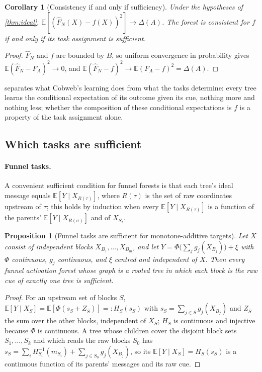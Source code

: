 \documentclass[11pt]{article}
\newtheorem{proposition}[theorem]{Proposition}
\newtheorem{corollary}[theorem]{Corollary}
\theoremstyle{definition}
\theoremstyle{remark}
\newcommand{\E}{\mathbb{E}}
\begin{document}
\begin{corollary}[Consistency if and only if sufficiency]\label{cor:iff}
Under the hypotheses of \cref{thm:ideal}, $\E[(\hat F_N(X)-f(X))^2]\to\Delta(A)$.  The
forest is consistent for $f$ if and only if its task assignment is sufficient.
\end{corollary}
\begin{proof}
$\hat F_N$ and $f$ are bounded by $B$, so uniform convergence in probability gives
$\E(\hat F_N-F_A)^2\to0$, and $\E(\hat F_N-f)^2\to\E(F_A-f)^2=\Delta(A)$.
\end{proof}

 separates what Cobweb's learning does from what the tasks determine:
every tree learns the conditional expectation of its outcome given its cue, nothing more
and nothing less; whether the composition of these conditional expectations is $f$ is a
property of the task assignment alone.

\subsection{Which tasks are sufficient}

\paragraph{Funnel tasks.}
A convenient sufficient condition for funnel forests is that each tree's ideal message
equals $\E[Y\mid X_{R(\tau)}]$, where $R(\tau)$ is the set of raw coordinates upstream of
$\tau$; this holds by induction when every $\E[Y\mid X_{R(\tau)}]$ is a function of the
parents' $\E[Y\mid X_{R(\sigma)}]$ and of $X_{S_\tau}$.

\begin{proposition}[Funnel tasks are sufficient for monotone-additive targets]\label{prop:suffclass}
Let $X$ consist of independent blocks $X_{B_1},\dots,X_{B_m}$, and let
$Y=\Phi\bigl(\sum_jg_j(X_{B_j})\bigr)+\xi$ with $\Phi$ continuous,
$g_j$ continuous, and $\xi$ centred and independent of $X$.  Then every funnel
activation forest whose graph is a rooted tree in which each block is the raw cue of
exactly one tree is sufficient.
\end{proposition}
\begin{proof}
For an upstream set of blocks $S$, $\E[Y\mid X_S]=\E[\Phi(s_S+Z_{\bar S})]=:H_S(s_S)$ with
$s_S=\sum_{j\in S}g_j(X_{B_j})$ and $Z_{\bar S}$ the sum over the other blocks, independent
of $X_S$; $H_S$ is continuous and injective because $\Phi$ is continuous.  A tree whose
children cover the disjoint block sets $S_1,\dots,S_k$ and which reads the raw blocks $S_0$
has $s_S=\sum_iH_{S_i}^{-1}(m_{S_i})+\sum_{j\in S_0}g_j(X_{B_j})$, so its
$\E[Y\mid X_S]=H_S(s_S)$ is a continuous function of its parents' messages and its raw
cue.
\end{proof}
\end{document}
